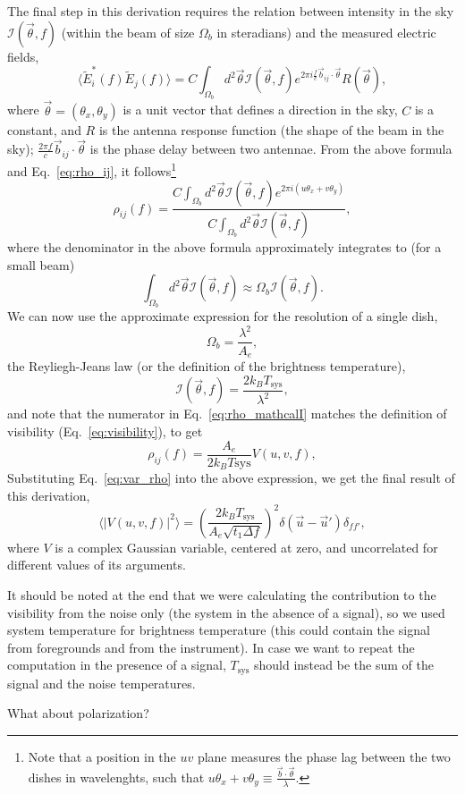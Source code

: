 \documentclass[12pt]{paper}
\newcommand{\beq}{\begin{equation}}
\newcommand{\eeq}{\end{equation}}
\begin{document}
The final step in this derivation requires the relation between intensity in the sky $\mathcal{I}(\vec\theta, f)$ (within the beam of size $\Omega_b$ in steradians) and the measured electric fields,
\beq
\langle \widetilde{E}_i^*(f)\widetilde{E}_j(f)\rangle = C \int_{\Omega_b} d^2\vec\theta\mathcal{I}(\vec\theta, f)e^{2\pi i\frac{ f}{c}\vec{b}_{ij}\cdot\vec{\theta}  }R(\vec\theta),
\label{eq:E_vs_mathcalI}
\eeq
where $\vec\theta=(\theta_x,\theta_y)$ is a unit vector that defines a direction in the sky, $C$ is a constant, and $R$ is the antenna response function (the shape of the beam in the sky); $\frac{2\pi f}{c}\vec{b}_{ij}\cdot\vec{\theta}$ is the phase delay between two antennae. From the above formula and Eq.~\ref{eq:rho_ij}, it follows\footnote{Note that a position in the $uv$ plane measures the phase lag between the two dishes in wavelenghts, such that $u\theta_x + v\theta_y\equiv\frac{\vec b\cdot \vec\theta}{\lambda}$.}
\beq
\rho_{ij}(f) = \frac{C\int_{\Omega_b}d^2\vec\theta\mathcal{I}(\vec\theta, f)e^{2\pi i(u\theta_x+v\theta_y)}}{C\int_{\Omega_b}d^2\vec\theta\mathcal{I}(\vec\theta, f)},
\label{eq:rho_mathcalI}
\eeq
where the denominator in the above formula approximately integrates to (for a small beam)
\beq
\int_{\Omega_b}d^2\vec\theta\mathcal{I}(\vec\theta, f) \approx
\Omega_b \mathcal{I}(\vec\theta, f).
\label{eq:rho_denominator}
\eeq
We can now use the approximate expression for the resolution of a single dish,
\beq
\Omega_b = \frac{\lambda^2}{A_e},
\label{eq:Omegab}
\eeq
the Reyliegh-Jeans law (or the definition of the brightness temperature),
\beq
\mathcal{I}(\vec\theta, f) = \frac{2k_BT_\text{sys}}{\lambda^2},
\label{eq:I_Tsys}
\eeq
and note that the numerator in Eq.~\ref{eq:rho_mathcalI} matches the definition of visibility (Eq.~\ref{eq:visibility}), to get 
\beq
\rho_{ij}(f) = \frac{A_e}{2k_BT\text{sys}}V(u,v,f),
\label{eq:rho_V}
\eeq
Substituting Eq.~\ref{eq:var_rho} into the above expression, we get the final result of this derivation,
\beq
\langle|V(u,v,f)|^2\rangle = \left(\frac{2k_BT_\text{sys}}{A_e\sqrt{t_1\Delta f}}\right)^2\delta(\vec{u}-\vec{u}')\delta_{ff'},
\label{eq:Vrms_final}
\eeq
where $V$ is a complex Gaussian variable, centered at zero, and uncorrelated for different values of its arguments.

It should be noted at the end that we were calculating the contribution to the visibility from the noise only (the system in the absence of a signal), so we used system temperature for brightness temperature (this could contain the signal from foregrounds and from the instrument). In case we want to repeat the computation in the presence of a signal, $T_\text{sys}$ should instead be the sum of the signal and the noise temperatures.

What about polarization?
\end{document}
